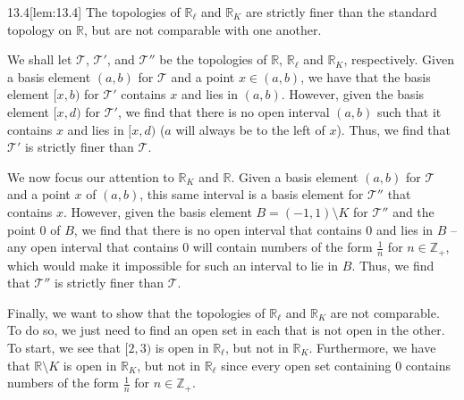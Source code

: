 \begin{thmBox}[Lemma]{13.4}[lem:13.4]
    The topologies of \( \mathbb{R}_{ \ell } \) and \( \mathbb{R}_{ K } \)
    are strictly finer than the standard topology on \( \mathbb{R} \), but are 
    not comparable with one another.

    \baseRule

    \begin{proofBox}
        We shall let \( \mathcal{T} \), \( \mathcal{T}' \), and 
        \( \mathcal{T}'' \) be the topologies of \( \mathbb{R} \), 
        \( \mathbb{R}_{ \ell } \) and \( \mathbb{R}_{ K } \), respectively. 
        Given a basis element \( ( a, b ) \) for \( \mathcal{T} \) and a point 
        \( x \in ( a, b ) \), we have that the basis element \( [ x, b ) \) for 
        \( \mathcal{T}' \) contains \( x \) and lies in \( ( a, b ) \).
        However, given the basis element \( [ x, d ) \) for \( \mathcal{T}' \),
        we find that there is no open interval \( ( a, b ) \) such that it 
        contains \( x \) and lies in \( [ x, d ) \) (\( a \) will always be to 
        the left of \( x \)).
        Thus, we find that \( \mathcal{T}' \) is strictly finer than 
        \( \mathcal{T} \).

        \baseSkip 

        We now focus our attention to \( \mathbb{R}_{ K } \) and 
        \( \mathbb{R} \). 
        Given a basis element \( ( a, b ) \) for \( \mathcal{T} \) and a point 
        \( x \) of \( ( a, b ) \), this same interval is a basis element for 
        \( \mathcal{T}'' \) that contains \( x \).
        However, given the basis element \( B = ( -1, 1 ) \setminus K \) for 
        \( \mathcal{T}'' \) and the point \( 0 \) of \( B \), 
        we find that there is 
        no open interval that contains \( 0 \) and lies in \( B \) -- any open 
        interval that contains \( 0 \) will contain numbers of the form 
        \( \frac{ 1 }{ n } \) for \( n \in \mathbb{Z}_{ + } \), which would 
        make it impossible for such an interval to lie in \( B \).
        Thus, we find that \( \mathcal{T}'' \) is strictly finer than 
        \( \mathcal{T} \).

        \baseSkip 

        Finally, we want to show that the topologies of 
        \( \mathbb{R}_{ \ell } \) and \( \mathbb{R}_{ K } \) are not 
        comparable.
        To do so, we just need to find an open set in each that is not open in 
        the other.
        To start, we see that \( [ 2, 3 ) \) is open in 
        \( \mathbb{R}_{ \ell } \), but not in \( \mathbb{R}_{ K } \).
        Furthermore, we have that \( \mathbb{R} \setminus K \) is open in 
        \( \mathbb{R}_{ K } \), but not in \( \mathbb{R}_{ \ell } \) since 
        every open set containing \( 0 \) contains numbers of the form 
        \( \frac{ 1 }{ n } \) for \( n \in \mathbb{Z}_{ + } \).
    \end{proofBox}
\end{thmBox}